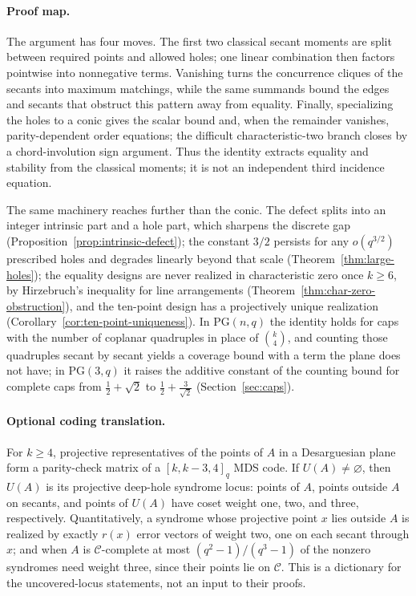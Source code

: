 \documentclass[11pt]{article}
\theoremstyle{definition}
\theoremstyle{remark}
\newcommand{\PG}{\mathrm{PG}}
\newcommand{\cC}{\mathcal{C}}
\begin{document}
\paragraph{Proof map.}
The argument has four moves.  The first two classical secant moments are
split between required points and allowed holes; one linear combination then
factors pointwise into nonnegative terms.  Vanishing turns the concurrence
cliques of the secants into maximum matchings, while the same summands bound
the edges and secants that obstruct this pattern away from equality.  Finally,
specializing the holes to a conic gives the scalar bound and, when the
remainder vanishes, parity-dependent order equations; the difficult
characteristic-two branch closes by a chord-involution sign argument.  Thus
the identity extracts equality and stability from the classical moments; it
is not an independent third incidence equation.

The same machinery reaches further than the conic.  The defect splits into
an integer intrinsic part and a hole part, which sharpens the discrete gap
(Proposition~\ref{prop:intrinsic-defect}); the constant \(3/2\) persists for
any \(o(q^{3/2})\) prescribed holes and degrades linearly beyond that
scale (Theorem~\ref{thm:large-holes}); the equality designs are never
realized in characteristic zero once \(k\ge6\), by Hirzebruch's inequality
for line arrangements (Theorem~\ref{thm:char-zero-obstruction}), and the
ten-point design has a projectively unique realization
(Corollary~\ref{cor:ten-point-uniqueness}).  In \(\PG(n,q)\) the identity
holds for caps with the number of coplanar quadruples in place of
\(\binom{k}{4}\), and counting those quadruples secant by secant yields a
coverage bound with a term the plane does not have; in \(\PG(3,q)\) it
raises the additive constant of the counting bound for complete caps from
\(\frac12+\sqrt2\) to \(\frac12+\frac3{\sqrt2}\)
(Section~\ref{sec:caps}).

\paragraph{Optional coding translation.}
For \(k\ge4\), projective representatives of the points of \(A\) in a
Desarguesian plane form a parity-check matrix of a \([k,k-3,4]_q\) MDS
code.  If \(U(A)\ne\varnothing\), then \(U(A)\) is its projective
deep-hole syndrome locus: points of \(A\), points outside \(A\) on
secants, and points of \(U(A)\) have coset weight one, two, and three,
respectively.  Quantitatively, a syndrome whose projective point \(x\) lies
outside \(A\) is realized by exactly \(r(x)\) error vectors of weight two,
one on each secant through \(x\); and when \(A\) is \(\cC\)-complete at
most \((q^2-1)/(q^3-1)\) of the nonzero syndromes need weight three, since
their points lie on \(\cC\).  This is a
dictionary for the uncovered-locus statements, not an input to their proofs.
\end{document}
